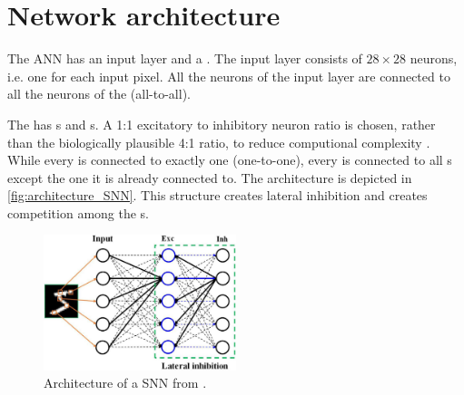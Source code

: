 \section{Network architecture}
\label{subsec:architecture}


The \ac{ANN} has an input layer and a \pLayer{} \cite{SNN}.
The input layer consists of $28 \times 28$ neurons, i.e. one for each input pixel.
All the neurons of the input layer are connected to all the neurons of the \pLayer{} (all-to-all).

The \pLayer{} has \eN{}s and \iN{}s.
A 1:1 excitatory to inhibitory neuron ratio is chosen, rather than the biologically plausible 4:1 ratio, 
to reduce computional complexity \cite{SNN}.
While every \eN{} is connected to exactly one \iN{} (one-to-one), every \iN{} is connected to all \eN{}s except the one it is already connected to.
The architecture is depicted in \autoref{fig:architecture_SNN}.
This structure creates lateral inhibition and creates competition among the \eN{}s.

\begin{figure}[htbp]
    \center
    \includegraphics[width=0.5\textwidth]{pictures/fnins-15-638474-g001.jpg}
    \caption{Architecture of a \ac{SNN} from \cite{architecture_SNN_picture}.}
    \label{fig:architecture_SNN}
\end{figure}